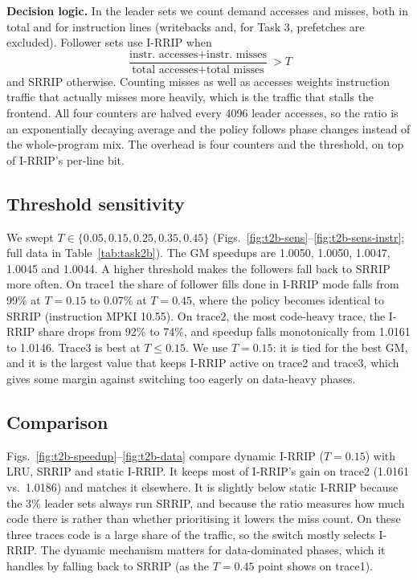 \documentclass[conference]{IEEEtran}
\begin{document}
\textbf{Decision logic.} In the leader sets we count demand accesses and
misses, both in total and for instruction lines (writebacks and, for Task 3,
prefetches are excluded). Follower sets use I-RRIP when
\begin{equation*}
\frac{\text{instr.\ accesses} + \text{instr.\ misses}}{\text{total accesses} + \text{total misses}} > T
\end{equation*}
and SRRIP otherwise. Counting misses as well as accesses weights instruction
traffic that actually misses more heavily, which is the traffic that stalls
the frontend. All four counters are halved every 4096 leader accesses, so the
ratio is an exponentially decaying average and the policy follows phase
changes instead of the whole-program mix. The overhead is four counters and
the threshold, on top of I-RRIP's per-line bit.

\subsection{Threshold sensitivity}
We swept $T \in \{0.05, 0.15, 0.25, 0.35, 0.45\}$
(Figs.~\ref{fig:t2b-sens}--\ref{fig:t2b-sens-instr}; full data in
Table~\ref{tab:task2b}). The GM speedups are 1.0050, 1.0050, 1.0047, 1.0045 and
1.0044. A higher threshold makes the followers fall back to SRRIP more often.
On trace1 the share of follower fills done in I-RRIP mode falls from 99\% at
$T{=}0.15$ to 0.07\% at $T{=}0.45$, where the policy becomes identical to SRRIP
(instruction MPKI 10.55). On trace2, the most code-heavy trace, the I-RRIP share
drops from 92\% to 74\%, and speedup falls monotonically from 1.0161 to 1.0146.
Trace3 is best at $T \le 0.15$. We use $T{=}0.15$: it is tied for the best GM,
and it is the largest value that keeps I-RRIP active on trace2 and trace3, which
gives some margin against switching too eagerly on data-heavy phases.

\subsection{Comparison}
Figs.~\ref{fig:t2b-speedup}--\ref{fig:t2b-data} compare dynamic I-RRIP
($T{=}0.15$) with LRU, SRRIP and static I-RRIP. It keeps most of I-RRIP's gain on
trace2 (1.0161 vs.\ 1.0186) and matches it elsewhere. It is slightly below
static I-RRIP because the 3\% leader sets always run SRRIP, and because the ratio
measures how much code there is rather than whether prioritising it lowers the
miss count. On these three traces code is a large share of the traffic, so the
switch mostly selects I-RRIP. The dynamic mechanism matters for data-dominated
phases, which it handles by falling back to SRRIP (as the $T{=}0.45$ point
shows on trace1).
\end{document}

